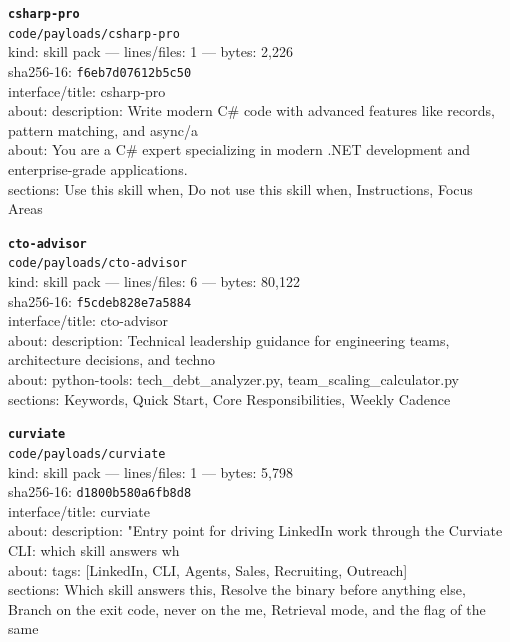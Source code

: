 \noindent\textbf{\texttt{csharp-pro}}\\
\texttt{code/payloads/csharp-pro}\\
kind: skill pack --- lines/files: 1 --- bytes: 2,226\\
sha256-16: \texttt{f6eb7d07612b5c50}\\
interface/title: csharp-pro\\
about: description: Write modern C\# code with advanced features like records, pattern matching, and async/a\\
about: You are a C\# expert specializing in modern .NET development and enterprise-grade applications.\\
sections: Use this skill when, Do not use this skill when, Instructions, Focus Areas\\
\vspace*{6.0pt}
\newpage

\noindent\textbf{\texttt{cto-advisor}}\\
\texttt{code/payloads/cto-advisor}\\
kind: skill pack --- lines/files: 6 --- bytes: 80,122\\
sha256-16: \texttt{f5cdeb828e7a5884}\\
interface/title: cto-advisor\\
about: description: Technical leadership guidance for engineering teams, architecture decisions, and techno\\
about: python-tools: tech\_debt\_analyzer.py, team\_scaling\_calculator.py\\
sections: Keywords, Quick Start, Core Responsibilities, Weekly Cadence\\
\vspace*{6.0pt}

\noindent\textbf{\texttt{curviate}}\\
\texttt{code/payloads/curviate}\\
kind: skill pack --- lines/files: 1 --- bytes: 5,798\\
sha256-16: \texttt{d1800b580a6fb8d8}\\
interface/title: curviate\\
about: description: "Entry point for driving LinkedIn work through the Curviate CLI: which skill answers wh\\
about: tags: [LinkedIn, CLI, Agents, Sales, Recruiting, Outreach]\\
sections: Which skill answers this, Resolve the binary before anything else, Branch on the exit code, never on the me, Retrieval mode, and the flag of the same\\
\vspace*{6.0pt}

